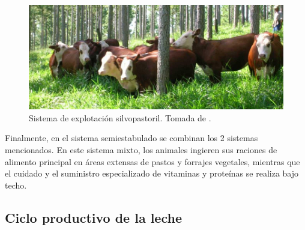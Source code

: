 \begin{figure}[H]
 \begin{center}
 \includegraphics[scale=0.9]{img/silvopastoril.png}
 \end{center}
 \caption{Sistema de explotación silvopastoril. Tomada de \cite{contextoganadero}. \label{silvopng}}
\end{figure}

Finalmente, en el sistema semiestabulado se combinan los 2 sistemas mencionados. En este sistema mixto, los animales ingieren sus raciones de alimento principal en áreas extensas de pastos y forrajes vegetales, mientras que el cuidado y el suministro especializado de vitaminas y proteínas se realiza bajo techo.
\subsection{Ciclo productivo de la leche}


